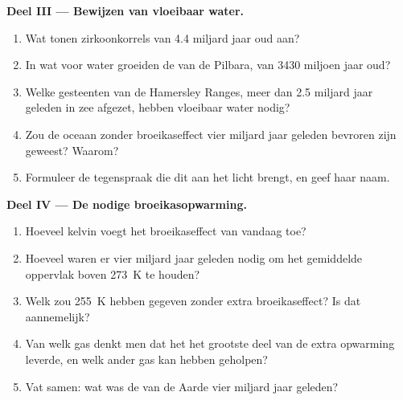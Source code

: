 \begin{problem}
\medskip
\noindent\textbf{Deel III --- Bewijzen van vloeibaar water.}
\begin{enumerate}[resume]
  \item Wat tonen zirkoonkorrels van 4.4 miljard jaar oud aan?
  \item In wat voor water groeiden de  van de Pilbara, van
        \num{3430} miljoen jaar oud?
  \item Welke gesteenten van de Hamersley Ranges, meer dan 2.5 miljard jaar geleden
        in zee afgezet, hebben vloeibaar water nodig?
  \item Zou de oceaan zonder broeikaseffect vier miljard jaar geleden
        bevroren zijn geweest? Waarom?
  \item Formuleer de tegenspraak die dit aan het licht brengt, en geef haar naam.
\end{enumerate}

\medskip
\noindent\textbf{Deel IV --- De nodige broeikasopwarming.}
\begin{enumerate}[resume]
  \item Hoeveel kelvin voegt het broeikaseffect van vandaag toe?
  \item Hoeveel waren er vier miljard jaar geleden nodig om het gemiddelde
        oppervlak boven \qty{273}{K} te houden?
  \item Welk  zou \qty{255}{K} hebben gegeven zonder extra
        broeikaseffect? Is dat aannemelijk?
  \item Van welk gas denkt men dat het het grootste deel van de extra opwarming leverde, en
        welk ander gas kan hebben geholpen?
  \item Vat samen: wat was de  van de Aarde vier miljard
        jaar geleden?
\end{enumerate}
\end{problem}
